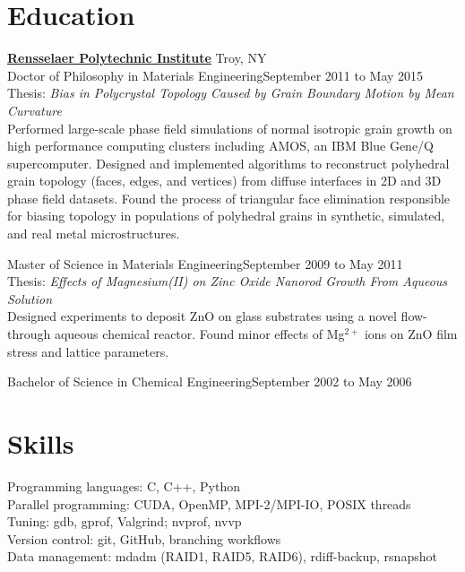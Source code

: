 \documentclass[margin]{res}
\begin{document}
\begin{resume}
 \section{Education}
 {\bf \href{http://www.rpi.edu}{Rensselaer Polytechnic Institute}} \hfill Troy, NY\\
 Doctor of Philosophy in Materials Engineering\hfill September 2011 to May 2015\\
 Thesis: \emph{Bias in Polycrystal Topology Caused by Grain Boundary Motion by Mean Curvature}\\
 [0.25\baselineskip]
Performed large-scale phase field simulations of normal isotropic grain growth on high performance computing clusters including AMOS, an IBM Blue Gene/Q supercomputer. Designed and implemented algorithms to reconstruct polyhedral grain topology (faces, edges, and vertices) from diffuse interfaces in 2D and 3D phase field datasets. Found the process of triangular face elimination responsible for biasing topology in populations of polyhedral grains in synthetic, simulated, and real metal microstructures.

 Master of Science in Materials Engineering\hfill September 2009 to May 2011\\
 Thesis: \emph{Effects of Magnesium(II) on Zinc Oxide Nanorod Growth From Aqueous Solution}\\
 [0.25\baselineskip]
Designed experiments to deposit ZnO on glass substrates using a novel flow-through aqueous chemical reactor. Found minor effects of Mg$^{2+}$ ions on ZnO film stress and lattice parameters.

 Bachelor of Science in Chemical Engineering\hfill September 2002 to May 2006\\
 \section{Skills}
Programming languages: C, C++, Python\\[0.25\baselineskip]
Parallel programming: CUDA, OpenMP, MPI-2/MPI-IO, POSIX threads\\[0.25\baselineskip]
Tuning: gdb, gprof, Valgrind; nvprof, nvvp\\[0.25\baselineskip]
Version control: git, GitHub, branching workflows\\[0.25\baselineskip]
Data management: mdadm (RAID1, RAID5, RAID6), rdiff-backup, rsnapshot\\[0.25\baselineskip]

\end{resume}
\end{document}
